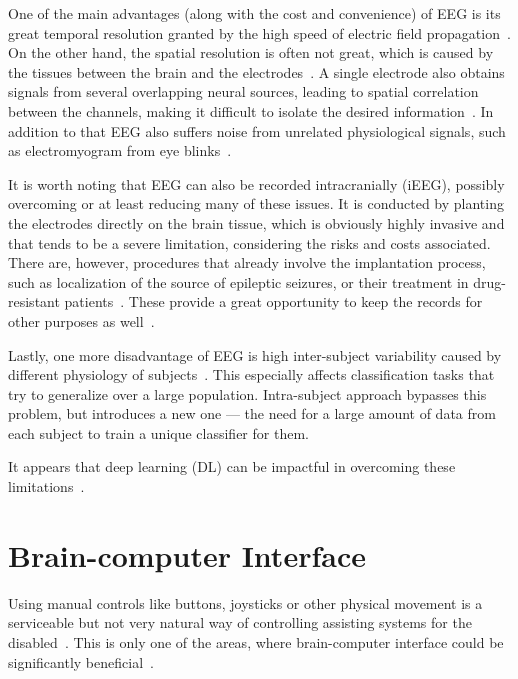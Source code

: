 \documentclass[english, he, bc, kiv, iso690alph]{fasthesis}
\begin{document}
One of the main advantages (along with the cost and convenience) of EEG is its great temporal resolution granted by the high speed of electric field propagation~\cite{roy:eeg:review:19}. On the other hand, the spatial resolution is often not great, which is caused by the tissues between the brain and the electrodes~\cite{roy:eeg:review:19, berezutskaya:ieeg:22}. A single electrode also obtains signals from several overlapping neural sources, leading to spatial correlation between the channels, making it difficult to isolate the desired information~\cite{roy:eeg:review:19, luck:erp:book}. In addition to that EEG also suffers noise from unrelated physiological signals, such as electromyogram from eye blinks~\cite{craik:dl:eeg:rev:19}.

It is worth noting that EEG can also be recorded intracranially (iEEG), possibly overcoming or at least reducing many of these issues. It is conducted by planting the electrodes directly on the brain tissue, which is obviously highly invasive and that tends to be a severe limitation, considering the risks and costs associated. There are, however, procedures that already involve the implantation process, such as localization of the source of epileptic seizures, or their treatment in drug-resistant patients~\cite{jobst:iEEG:20}. These provide a great opportunity to keep the records for other purposes as well~\cite{berezutskaya:ieeg:22}.

Lastly, one more disadvantage of EEG is high inter-subject variability caused by different physiology of subjects~\cite{roy:eeg:review:19}. This especially affects classification tasks that try to generalize over a large population. Intra-subject approach bypasses this problem, but introduces a new one --- the need for a large amount of data from each subject to train a unique classifier for them.

It appears that deep learning (DL) can be impactful in overcoming these limitations~\cite{roy:eeg:review:19}.

\section{Brain-computer Interface}
\label{sec:bci}

Using manual controls like buttons, joysticks or other physical movement is a serviceable but not very natural way of controlling assisting systems for the disabled~\cite{he:bci:legs:18}. This is only one of the areas, where brain-computer interface could be significantly beneficial~\cite{craik:dl:eeg:rev:19}.
\end{document}
